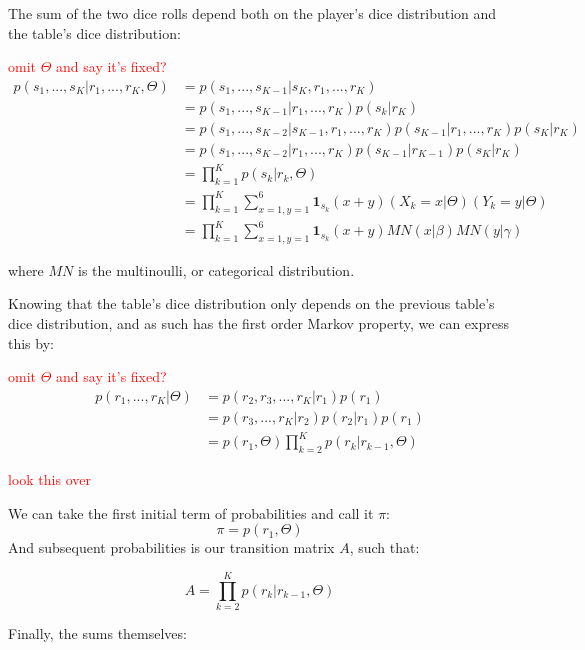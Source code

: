 \documentclass[12pt]{article}
\newcommand\mytodo[1]{\textcolor{red}{#1}}
\begin{document}
The sum of the two dice rolls depend both on the player's dice distribution and the table's dice distribution:

\mytodo{omit $\Theta$ and say it's fixed?}
\begin{equation}
\begin{split}
p(s_1, ..., s_K \vert r_1, ..., r_K, \Theta) &= p(s_1,...,s_{K-1} \vert s_K, r_1, ..., r_K)
\\
&=p(s_1, ..., s_{K-1} \vert r_1, ..., r_K) p(s_k \vert r_K)
\\
&=p(s_1,...,s_{K-2} \vert s_{K-1}, r_1, ..., r_K) p(s_{K-1} \vert r_1,...,r_K)p(s_K \vert r_K)
\\
&=p(s_1, ..., s_{K-2} \vert r_1, ..., r_K) p(s_{K-1} \vert r_{K-1}) p(s_{K} \vert r_K)
\\
&=\prod_{k=1}^{K} p(s_k \vert r_k, \Theta)
\\
&= \prod_{k=1}^{K} \sum_{x=1,y=1}^{6} \boldsymbol{1}_{s_k}(x + y) (X_k = x \vert \Theta) (Y_k = y \vert \Theta)
\\
&= \prod_{k=1}^{K} \sum_{x=1,y=1}^{6} \boldsymbol{1}_{s_k}(x + y) MN(x \vert \beta) MN(y \vert \gamma)
\end{split}
\end{equation}

where $MN$ is the multinoulli, or categorical distribution.

Knowing that the table's dice distribution only depends on the previous table's dice distribution, and as such has the first order Markov property, we can express this by:

\mytodo{omit $\Theta$ and say it's fixed?}
\begin{equation}
\begin{split}
p(r_1,...,r_K \vert \Theta) &= p(r_2, r_3, ..., r_K \vert r_1)p(r_1)
\\
&= p(r_3,...,r_K \vert r_2)p(r_2 \vert r_1) p(r_1)
\\
&=p(r_1, \Theta) \prod_{k=2}^{K} p(r_k \vert r_{k-1}, \Theta)
\end{split}
\end{equation}

\mytodo{look this over}

We can take the first initial term of probabilities and call it $\pi$:
$$\pi =  p(r_1, \Theta)$$
And subsequent probabilities is our transition matrix $A$, such that:

$$A = \prod_{k=2}^{K} p(r_k \vert r_{k-1}, \Theta)$$

Finally, the sums themselves:
\end{document}
